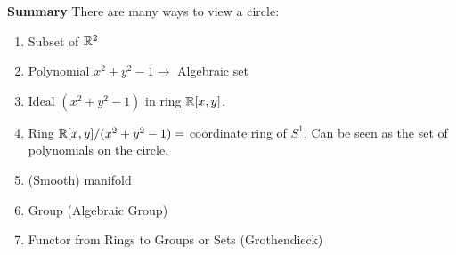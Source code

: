 \textbf{Summary}
There are many ways to view a circle:\begin{enumerate}
    \item Subset of $\mathbb{R}^2$
    \item Polynomial $x^2+y^2-1 \rightarrow$   Algebraic set
    \item Ideal $(x^2+y^2-1)$ in ring $\mathbb{R}[x,y]$.
    \item Ring $\mathbb{R}[x,y]/(x^2+y^2-1) = $ coordinate ring of $S^1$. Can be seen as the set of polynomials on the circle.
    \item (Smooth) manifold
    \item Group (Algebraic Group)
    \item Functor from Rings to Groups or Sets (Grothendieck)
\end{enumerate}

